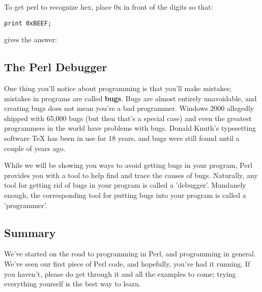 \documentclass[a4paper,11pt]{book}
\begin{document}
\noindent 

\noindent To get perl to recognize hex, place 0x in front of the digits so that:

\noindent 

\noindent \texttt{print 0xBEEF;}

\noindent 

\noindent gives the answer:

\noindent 



\noindent 

\subsection{The Perl Debugger}

\noindent 

\noindent One thing you'll notice about programming is that you'll make mistakes; mistakes in programs are called \textbf{bugs}. Bugs are almost entirely unavoidable, and creating bugs does not mean you're a bad programmer. Windows 2000 allegedly shipped with 65,000 bugs (but then that's a special case) and even the greatest programmers in the world have problems with bugs. Donald Knuth's typesetting software TeX has been in use for 18 years, and bugs were still found until a couple of years ago.

\noindent 

\noindent While we will be showing you ways to avoid getting bugs in your program, Perl provides you with a tool to help find and trace the causes of bugs. Naturally, any tool for getting rid of bugs in your program is called a 'debugger'. Mundanely enough, the corresponding tool for putting bugs into your program is called a 'programmer'.

\noindent 

\noindent 

\subsection{Summary}

\noindent 

\noindent We've started on the road to programming in Perl, and programming in general. We've seen our first piece of Perl code, and hopefully, you've had it running. If you haven't, please do get through it and all the examples to come; trying everything yourself is the best way to learn.

\noindent 
\end{document}
